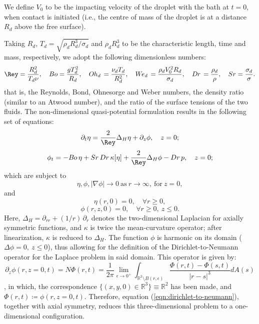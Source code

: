 \documentclass{jfm}
\newcommand{\Ohd}{O\kern-0.04em h_d\,}
\newcommand{\Bo}{B\kern-0.04em o\,}
\newcommand{\Dr}{D\kern-0.04em r\,}
\newcommand{\Wed}{W\kern-0.15em e _d\,}
\begin{document}
 We define $V_0$ to be the impacting velocity of the droplet with the bath at $t=0$, when contact is initiated (i.e., the centre of mass of the droplet is at a distance $R_d$ above the free surface). 

Taking $R_d$, $T_d = \sqrt{\rho_d R_d^3 / \sigma_d}$ and $\rho_d R_d^3$ to be the characteristic length, time and mass, respectively, we adopt the following dimensionless numbers:
\begin{equation}
    \label{eqn:adim_parameters}
    \Rey = \frac{R_d^2}{T_d \nu}, \quad  Bo = \frac{gT_d^2}{R_d}, \quad \Ohd = \frac{\nu_d T_d}{R_d^2},  \quad \Wed = \frac{\rho_d V_0^2 R_d}{\sigma_d}, \quad \Dr = \frac{\rho_d}{\rho}, \quad Sr = \frac{\sigma_d}{\sigma}.
\end{equation}
that is, the Reynolds, Bond, Ohnesorge and Weber numbers, the density ratio (similar to an Atwood number), and the ratio of the surface tensions of the two fluids.
The non-dimensional quasi-potential formulation \citep{GaleanoRiosEtAl2017} results in the following set of equations:
\begin{equation}
    \label{eqn:km_2}
    \partial_t \eta =\frac{2}{\Rey} \Delta_H \eta + \partial_z \phi, \quad z = 0;
\end{equation}
\begin{equation}
    \label{eqn:km_3}
   \phi_t = -\Bo \eta + Sr\, Dr\, \kappa[\eta] + \frac{2}{\Rey} \Delta_H \phi  - Dr \,p , \quad z = 0;
\end{equation}
which are subject to 
\begin{equation}
    \eta, \phi, |\nabla \phi| \to 0 \  \text{as} \ r\to\infty, \ \text{for}\  z = 0,
\end{equation}
and
\begin{equation}
    \eta(r,0) = 0,\quad\forall r\geq0,
\end{equation}
\begin{equation}
    \phi(r,z,0) = 0,\quad \forall r\geq 0,\  z\leq 0.
\end{equation}
Here, $\Delta_H = \partial_{rr} + (1/r)\,\partial_r$ denotes the two-dimensional Laplacian for axially symmetric functions, and $\kappa$ is twice the mean-curvature operator; after linearization, $\kappa$ is reduced to $\Delta_H$. The function $\phi$ is harmonic on its domain ($\Delta\phi = 0,\ z \leq 0$), thus allowing for the definition of the Dirichlet-to-Neumann operator for the Laplace problem in said domain. This operator is given by:
\begin{equation}
    \label{eqn:dirichlet-to-neumann}
    \partial_z \phi(r, z = 0, t) = N \Phi(r, t) = \frac{1}{2\pi} \lim_{\epsilon\to 0^+} \int_{\mathbb{R}^2 \setminus B(r, \epsilon)} \frac{\Phi(r, t) - \Phi(s, t)}{|r-s|^3} dA(s)
\end{equation}
\citep[see][]{GaleanoRiosEtAl2017}, in which, the correspondence $\{(x, y, 0) \in \mathbb{R}^3\} \equiv \mathbb{R}^2$ has been made, and $\Phi(r,t)\coloneqq \phi(r,z=0,t)$. Therefore, equation (\ref{eqn:dirichlet-to-neumann}), together with axial symmetry, reduces this three-dimensional problem to a one-dimensional configuration. 
\end{document}
